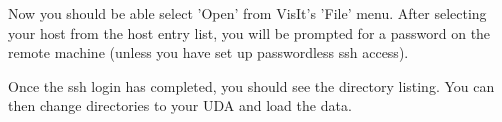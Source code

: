 \documentclass[12pt]{article}
\begin{document}
Now you should be able select 'Open' from VisIt's 'File' menu. After
selecting your host from the host entry list, you will be prompted for
a password on the remote machine (unless you have set up passwordless
ssh access).

Once the ssh login has completed, you should see the directory
listing. You can then change directories to your UDA and load the
data.
















\end{document}

